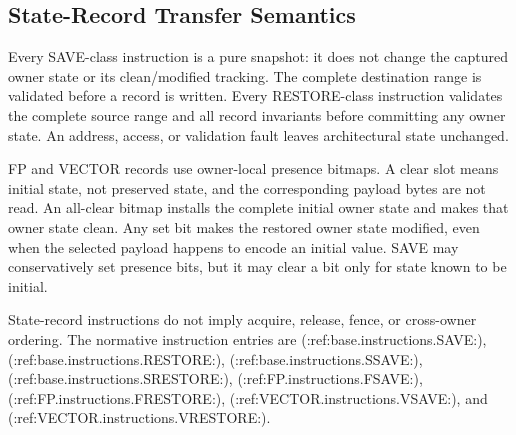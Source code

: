 \subsection{State-Record Transfer Semantics}

Every SAVE-class instruction is a pure snapshot: it does not change the captured owner state or its clean/modified tracking. The complete destination range is validated before a record is written. Every RESTORE-class instruction validates the complete source range and all record invariants before committing any owner state. An address, access, or validation fault leaves architectural state unchanged.

FP and VECTOR records use owner-local presence bitmaps. A clear slot means initial state, not preserved state, and the corresponding payload bytes are not read. An all-clear bitmap installs the complete initial owner state and makes that owner state clean. Any set bit makes the restored owner state modified, even when the selected payload happens to encode an initial value. SAVE may conservatively set presence bits, but it may clear a bit only for state known to be initial.

State-record instructions do not imply acquire, release, fence, or cross-owner ordering. The normative instruction entries are (:ref:base.instructions.SAVE:), (:ref:base.instructions.RESTORE:), (:ref:base.instructions.SSAVE:), (:ref:base.instructions.SRESTORE:), (:ref:FP.instructions.FSAVE:), (:ref:FP.instructions.FRESTORE:), (:ref:VECTOR.instructions.VSAVE:), and (:ref:VECTOR.instructions.VRESTORE:).
